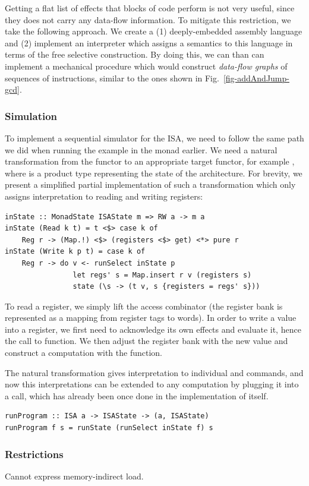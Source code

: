 Getting a flat list of effects that blocks of code perform is not very useful,
since they does not carry any data-flow information. To mitigate this restriction,
we take the following approach. We create a (1) deeply-embedded assembly language and
(2) implement an interpreter which assigns a semantics to this language in terms of the
free selective construction. By doing this, we can than can implement a mechanical procedure
which would construct \emph{data-flow graphs} of sequences of instructions, similar to
the ones shown in Fig.~\ref{fig-addAndJump-gcd}.

\subsubsection{\textbf{Simulation}}

To implement a sequential simulator for the ISA, we need to follow the same path we did
when running the  example in the  monad earlier. We need a natural
transformation from the functor  to an appropriate target functor, for example
, where  is a product type representing the state of the architecture. For brevity, we present a simplified
partial implementation of such a transformation which only assigns interpretation to reading
and writing registers:

\begin{verbatim}
inState :: MonadState ISAState m => RW a -> m a
inState (Read k t) = t <$> case k of
    Reg r -> (Map.!) <$> (registers <$> get) <*> pure r
inState (Write k p t) = case k of
    Reg r -> do v <- runSelect inState p
                let regs' s = Map.insert r v (registers s)
                state (\s -> (t v, s {registers = regs' s}))
\end{verbatim}

To read a register, we simply lift the  access combinator (the register bank
is represented as a mapping from register tags to words). In order to write a value into a
register, we first need to acknowledge its own effects and evaluate it, hence the call to
 function. We then adjust the register bank with the new value and construct
a  computation with the  function.

The  natural transformation gives interpretation to individual  and
 commands, and now this interpretations can be extended to any 
computation by plugging it into a  call, which has already been once done in
the implementation of  itself.

\begin{verbatim}
runProgram :: ISA a -> ISAState -> (a, ISAState)
runProgram f s = runState (runSelect inState f) s
\end{verbatim}

\subsubsection{\textbf{Restrictions}}

Cannot express memory-indirect load.